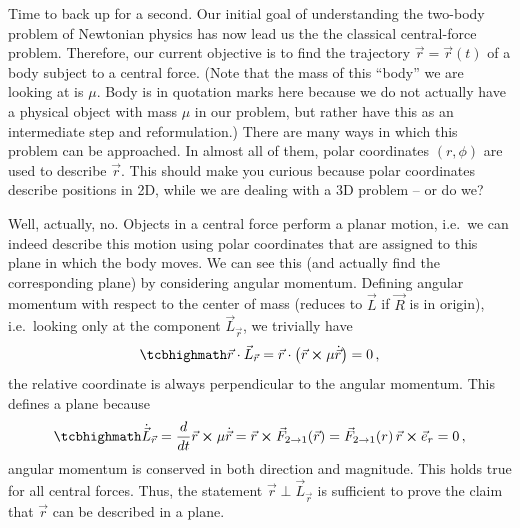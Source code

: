 \documentclass[../class_mech_main.tex]{subfiles}
\begin{document}
Time to back up for a second. Our initial goal of understanding the two-body problem of Newtonian physics has now lead us the the classical central-force problem. Therefore, our current objective is to find the trajectory $\vec{r} = \vec{r}(t)$ of a body subject to a central force. (Note that the mass of this \enquote{body} we are looking at is $\mu$. Body is in quotation marks here because we do not actually have a physical object with mass $\mu$ in our problem, but rather have this as an intermediate step and reformulation.) There are many ways in which this problem can be approached. In almost all of them, polar coordinates $(r, \phi)$ are used to describe $\vec{r}$. This should make you curious because polar coordinates describe positions in 2D, while we are dealing with a 3D problem -- or do we?

Well, actually, no. Objects in a central force perform a planar motion, i.e.~we can indeed describe this motion using polar coordinates that are assigned to this plane in which the body moves. We can see this (and actually find the corresponding plane) by considering angular momentum. Defining angular momentum with respect to the center of mass (reduces to $\vec{L}$ if $\vec{R}$ is in origin), i.e.~looking only at the component $\vec{L}_{\vec{r}}$, we trivially have
\begin{equation}
	\eqbox{
		\vec{r} \cdot \vec{L}_{\vec{r}} = \vec{r} \cdot \qty(\vec{r} \cross \mu \dot{\vec{r}}) = 0
	} \, ,
\end{equation}
the relative coordinate is always perpendicular to the angular momentum. This defines a plane because
\begin{equation}
	\eqbox{
		\dot{\vec{L}}_{\vec{r}} = \dv{t} \vec{r} \cross \mu \dot{\vec{r}} = \vec{r} \cross \vec{F}_{2 \rightarrow 1}(\vec{r}) = \vec{F}_{2 \rightarrow 1}(r) \, \vec{r} \cross \vec{e}_r = 0
	} \, ,
\end{equation}
angular momentum is conserved in both direction and magnitude. This holds true for all central forces.%
Thus, the statement $\vec{r} \perp \vec{L}_{\vec{r}}$ is sufficient to prove the claim that $\vec{r}$ can be described in a plane.
\end{document}
